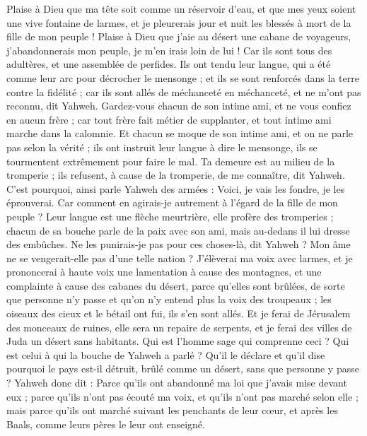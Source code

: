 \begin{multicols}{2}
\VerseOne{}Plaise à Dieu que ma tête soit comme un réservoir d'eau, et que mes yeux soient une vive fontaine de larmes, et je pleurerais jour et nuit les blessés à mort de la fille de mon peuple !
Plaise à Dieu que j'aie au désert une cabane de voyageurs, j'abandonnerais mon peuple, je m'en irais loin de lui ! Car ils sont tous des adultères, et une assemblée de perfides.
Ils ont tendu leur langue, qui a été comme leur arc pour décrocher le mensonge ; et ils se sont renforcés dans la terre contre la fidélité ; car ils sont allés de méchanceté en méchanceté, et ne m'ont pas reconnu, dit Yahweh.
Gardez-vous chacun de son intime ami, et ne vous confiez en aucun frère ; car tout frère fait métier de supplanter, et tout intime ami marche dans la calomnie.
Et chacun se moque de son intime ami, et on ne parle pas selon la vérité ; ils ont instruit leur langue à dire le mensonge, ils se tourmentent extrêmement pour faire le mal.
Ta demeure est au milieu de la tromperie ; ils refusent, à cause de la tromperie, de me connaître, dit Yahweh.
C'est pourquoi, ainsi parle Yahweh des armées : Voici, je vais les fondre, je les éprouverai. Car comment en agirais-je autrement à l'égard de la fille de mon peuple ?
Leur langue est une flèche meurtrière, elle profère des tromperies ; chacun de sa bouche parle de la paix avec son ami, mais au-dedans il lui dresse des embûches.
Ne les punirais-je pas pour ces choses-là, dit Yahweh ? Mon âme ne se vengerait-elle pas d'une telle nation ?
J'élèverai ma voix avec larmes, et je prononcerai à haute voix une lamentation à cause des montagnes, et une complainte à cause des cabanes du désert, parce qu'elles sont brûlées, de sorte que personne n'y passe et qu'on n'y entend plus la voix des troupeaux ; les oiseaux des cieux et le bétail ont fui, ils s'en sont allés.
Et je ferai de Jérusalem des monceaux de ruines, elle sera un repaire de serpents, et je ferai des villes de Juda un désert sans habitants.
Qui est l'homme sage qui comprenne ceci ? Qui est celui à qui la bouche de Yahweh a parlé ? Qu'il le déclare et qu'il dise pourquoi le pays est-il détruit, brûlé comme un désert, sans que personne y passe ?
Yahweh donc dit : Parce qu'ils ont abandonné ma loi que j'avais mise devant eux ; parce qu'ils n'ont pas écouté ma voix, et qu'ils n'ont pas marché selon elle ;
mais parce qu'ils ont marché suivant les penchants de leur cœur, et après les Baals, comme leurs pères le leur ont enseigné.

\end{multicols}
